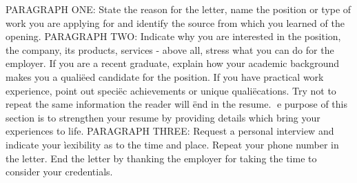 PARAGRAPH ONE: State the reason for the letter, name the position or type of work you
are applying for and identify the source from which you learned of the opening.
PARAGRAPH TWO: Indicate why you are interested in the position, the company, its products,
services - above all, stress what you can do for the employer. If you are a recent graduate,
explain how your academic background makes you a qualiëed candidate for the position. If
you have practical work experience, point out speciëc achievements or unique qualiëcations.
Try not to repeat the same information the reader will ënd in the resume. e purpose of this
section is to strengthen your resume by providing details which bring your experiences to life.
PARAGRAPH THREE: Request a personal interview and indicate your ìexibility as to the
time and place. Repeat your phone number in the letter. End the letter by thanking the employer
for taking the time to consider your credentials.